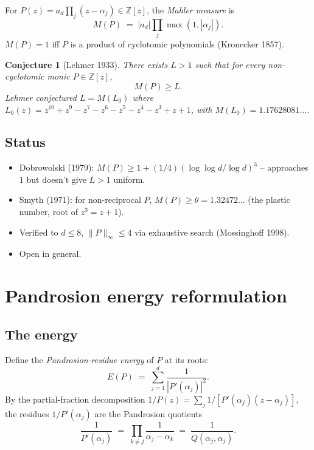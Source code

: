 \documentclass[11pt,a4paper]{article}
\newtheorem{conjecture}[theorem]{Conjecture}
\begin{document}
For $P(z) = a_d \prod_j (z - \alpha_j) \in \mathbb Z[z]$, the \emph{Mahler measure} is
\begin{equation}\label{eq:mahler}
M(P) \;=\; |a_d| \prod_j \max(1, |\alpha_j|).
\end{equation}
$M(P) = 1$ iff $P$ is a product of cyclotomic polynomials (Kronecker 1857).

\begin{conjecture}[Lehmer 1933]\label{conj:lehmer}
There exists $L > 1$ such that for every non-cyclotomic monic $P \in \mathbb Z[z]$,
\begin{equation}\label{eq:lehmer}
M(P) \ge L.
\end{equation}
Lehmer conjectured $L = M(L_0)$ where $L_0(z) = z^{10} + z^9 - z^7 - z^6 - z^5 - z^4 - z^3 + z + 1$, with $M(L_0) = 1.17628081\dots$.
\end{conjecture}

\subsection{Status}
\begin{itemize}
\item Dobrowolski (1979): $M(P) \ge 1 + (1/4)(\log\log d/\log d)^3$ -- approaches $1$ but doesn't give $L > 1$ uniform.
\item Smyth (1971): for non-reciprocal $P$, $M(P) \ge \theta = 1.32472\ldots$ (the plastic number, root of $z^3 = z + 1$).
\item Verified to $d \le 8$, $\|P\|_\infty \le 4$ via exhaustive search (Mossinghoff 1998).
\item Open in general.
\end{itemize}

\section{Pandrosion energy reformulation}\label{sec:reform}

\subsection{The energy}
Define the \emph{Pandrosion-residue energy} of $P$ at its roots:
\begin{equation}\label{eq:E}
E(P) \;=\; \sum_{j=1}^{d} \frac{1}{|P'(\alpha_j)|^2}.
\end{equation}
By the partial-fraction decomposition $1/P(z) = \sum_j 1/[P'(\alpha_j)(z - \alpha_j)]$, the residues $1/P'(\alpha_j)$ are the Pandrosion quotients
\begin{equation}\label{eq:Q-residue}
\frac{1}{P'(\alpha_j)} \;=\; \prod_{k \ne j} \frac{1}{\alpha_j - \alpha_k} \;=\; \frac{1}{Q(\alpha_j, \alpha_j)}.
\end{equation}
\end{document}
